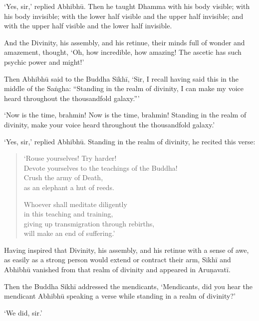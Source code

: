 \documentclass[12pt,openany]{book}%
\begin{document}
‘Yes, sir,’ replied \textsanskrit{Abhibhū}. Then he taught Dhamma with his body visible; with his body invisible; with the lower half visible and the upper half invisible; and with the upper half visible and the lower half invisible. 

And the Divinity, his assembly, and his retinue, their minds full of wonder and amazement, thought, ‘Oh, how incredible, how amazing! The ascetic has such psychic power and might!’ 

Then \textsanskrit{Abhibhū} said to the Buddha \textsanskrit{Sikhī}, ‘Sir, I recall having said this in the middle of the \textsanskrit{Saṅgha}: “Standing in the realm of divinity, I can make my voice heard throughout the thousandfold galaxy.”’ 

‘Now is the time, brahmin! Now is the time, brahmin! Standing in the realm of divinity, make your voice heard throughout the thousandfold galaxy.’ 

‘Yes, sir,’ replied \textsanskrit{Abhibhū}. Standing in the realm of divinity, he recited this verse: 

\begin{verse}%
‘Rouse yourselves! Try harder! \\
Devote yourselves to the teachings of the Buddha! \\
Crush the army of Death, \\
as an elephant a hut of reeds. 

Whoever shall meditate diligently \\
in this teaching and training, \\
giving up transmigration through rebirths, \\
will make an end of suffering.’ 

%
\end{verse}

Having inspired that Divinity, his assembly, and his retinue with a sense of awe, as easily as a strong person would extend or contract their arm, \textsanskrit{Sikhī} and \textsanskrit{Abhibhū} vanished from that realm of divinity and appeared in \textsanskrit{Aruṇavatī}. 

Then the Buddha \textsanskrit{Sikhī} addressed the mendicants, ‘Mendicants, did you hear the mendicant \textsanskrit{Abhibhū} speaking a verse while standing in a realm of divinity?’ 

‘We did, sir.’ 
\end{document}
